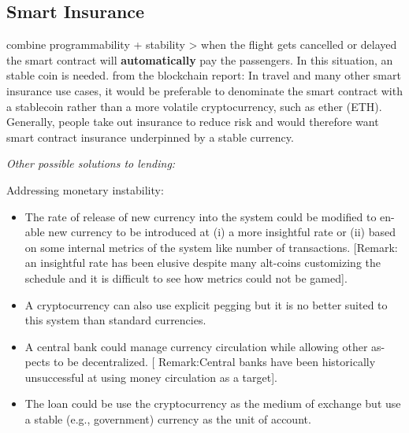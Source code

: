 %
%
%
%
%
%

\subsection{Smart Insurance}
combine programmability + stability > when the flight gets cancelled or delayed the smart contract will \textbf{automatically} pay the passengers. In this situation, an stable coin is needed.
from the blockchain report: In travel and many other smart insurance use cases, it would be preferable to denominate the smart contract with a stablecoin rather than a more volatile cryptocurrency, such as ether (ETH). Generally, people take out insurance to reduce risk and would therefore want smart contract insurance underpinned by a stable currency.

\textit{Other possible solutions to lending:} ~

Addressing monetary instability:
\begin{itemize}
	\item The rate of release of new currency into the system could be modified to en-
	able new currency to be introduced at (i) a more insightful rate or (ii) based
	on some internal metrics of the system like number of transactions. [Remark:
	an insightful rate has been elusive despite many alt-coins customizing the
	schedule and it is difficult to see how metrics could not be gamed].
	\item A cryptocurrency can also use explicit pegging but it is no better suited to this system than standard currencies.
	\item A central bank could manage currency circulation while allowing other as-
	pects to be decentralized. [	Remark:Central banks have been historically
	unsuccessful at using money circulation as a target].
	\item The loan could be use the cryptocurrency as the medium of exchange but
	use a stable (e.g.,	government) currency as the unit of account.
\end{itemize}

